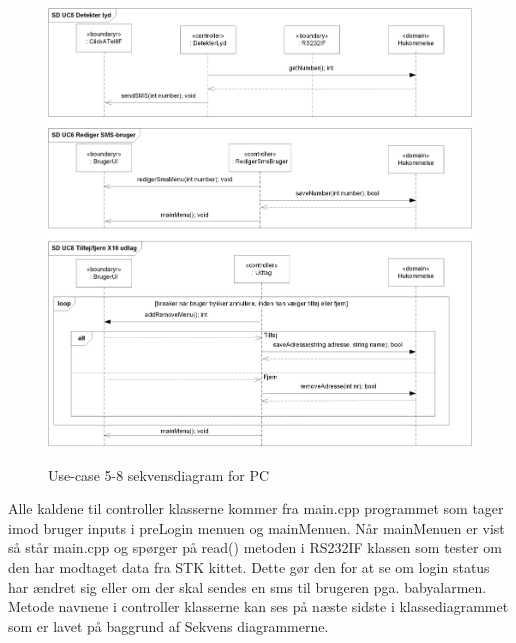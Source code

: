 \begin{figure}[!htb]
     {\includegraphics[width=\textwidth]{billeder/uml/PC_SD2}}
     \caption{Use-case 5-8 sekvensdiagram for PC}
     \label{fig:PC_SD2}
\end{figure}
Alle kaldene til controller klasserne kommer fra main.cpp programmet som tager imod bruger inputs i preLogin menuen og mainMenuen. Når mainMenuen er vist så står main.cpp og spørger på read() metoden i RS232IF klassen som tester om den har modtaget data fra STK kittet. Dette gør den for at se om login status har ændret sig eller om der skal sendes en sms til brugeren pga. babyalarmen.\\
Metode navnene i controller klasserne kan ses på næste sidste i klassediagrammet som er lavet på baggrund af Sekvens diagrammerne.

